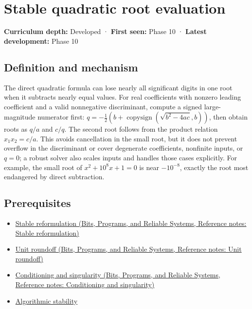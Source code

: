 \hypertarget{appendix-b9afba7f63e5}{}\label{referencestart:appendix-b9afba7f63e5}
\section{Stable quadratic root evaluation}\label{appendix-b9afba7f63e5-stable-quadratic-root-evaluation}

\textbf{Curriculum depth:} Developed · \textbf{First seen:} Phase 10 · \textbf{Latest development:} Phase 10

\begin{allmightroledefinition}

\subsection{Definition and mechanism}\label{appendix-b9afba7f63e5-definition-and-mechanism}

The direct quadratic formula can lose nearly all significant digits in one root when it subtracts nearly equal values. For real coefficients with nonzero leading coefficient and a valid nonnegative discriminant, compute a signed large-magnitude numerator first: \(q=-\frac12(b+\operatorname{copysign}(\sqrt{b^2-4ac},b))\), then obtain roots as \(q/a\) and \(c/q\). The second root follows from the product relation \(x_1x_2=c/a\). This avoids cancellation in the small root, but it does not prevent overflow in the discriminant or cover degenerate coefficients, nonfinite inputs, or \(q=0\); a robust solver also scales inputs and handles those cases explicitly. For example, the small root of \(x^2+10^8x+1=0\) is near \(-10^{-8}\), exactly the root most endangered by direct subtraction.

\end{allmightroledefinition}

\subsection{Prerequisites}\label{appendix-b9afba7f63e5-prerequisites}

\begin{itemize}
\tightlist
\item
  \href{../01-Bits-Programs-and-Reliable-Systems/main.pdf\#nameddest=appendix-d7f8ba961670}{Stable reformulation (Bits, Programs, and Reliable Systems, Reference notes: Stable reformulation)}
\item
  \href{../01-Bits-Programs-and-Reliable-Systems/main.pdf\#nameddest=appendix-bc44f7b42f42}{Unit roundoff (Bits, Programs, and Reliable Systems, Reference notes: Unit roundoff)}
\item
  \href{../01-Bits-Programs-and-Reliable-Systems/main.pdf\#nameddest=appendix-8f6a01f284a7}{Conditioning and singularity (Bits, Programs, and Reliable Systems, Reference notes: Conditioning and singularity)}
\item
  \hyperref[appendix-aa2bf0d79639]{Algorithmic stability}
\end{itemize}

